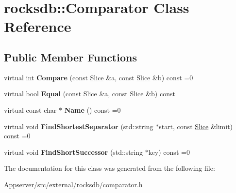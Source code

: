 \hypertarget{classrocksdb_1_1Comparator}{}\section{rocksdb\+:\+:Comparator Class Reference}
\label{classrocksdb_1_1Comparator}
\subsection*{Public Member Functions}
\begin{DoxyCompactItemize}
\item 
virtual int {\bfseries Compare} (const \hyperlink{classrocksdb_1_1Slice}{Slice} \&a, const \hyperlink{classrocksdb_1_1Slice}{Slice} \&b) const =0\hypertarget{classrocksdb_1_1Comparator_a9fe800fa52b86a61b626a58f46a38f81}{}\label{classrocksdb_1_1Comparator_a9fe800fa52b86a61b626a58f46a38f81}

\item 
virtual bool {\bfseries Equal} (const \hyperlink{classrocksdb_1_1Slice}{Slice} \&a, const \hyperlink{classrocksdb_1_1Slice}{Slice} \&b) const\hypertarget{classrocksdb_1_1Comparator_a539547b053be2dcf6e36fc95ebdc9890}{}\label{classrocksdb_1_1Comparator_a539547b053be2dcf6e36fc95ebdc9890}

\item 
virtual const char $\ast$ {\bfseries Name} () const =0\hypertarget{classrocksdb_1_1Comparator_a3ef0d8f8f4fe04540c00cd4a9c9d5e84}{}\label{classrocksdb_1_1Comparator_a3ef0d8f8f4fe04540c00cd4a9c9d5e84}

\item 
virtual void {\bfseries Find\+Shortest\+Separator} (std\+::string $\ast$start, const \hyperlink{classrocksdb_1_1Slice}{Slice} \&limit) const =0\hypertarget{classrocksdb_1_1Comparator_a69930f63e701669371046a0649770e62}{}\label{classrocksdb_1_1Comparator_a69930f63e701669371046a0649770e62}

\item 
virtual void {\bfseries Find\+Short\+Successor} (std\+::string $\ast$key) const =0\hypertarget{classrocksdb_1_1Comparator_adc2f1afc94736de2d450b1f3095c3baa}{}\label{classrocksdb_1_1Comparator_adc2f1afc94736de2d450b1f3095c3baa}

\end{DoxyCompactItemize}


The documentation for this class was generated from the following file\+:\begin{DoxyCompactItemize}
\item 
Appserver/src/external/rocksdb/comparator.\+h\end{DoxyCompactItemize}
